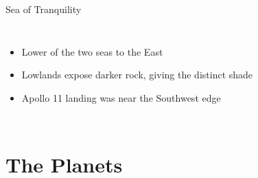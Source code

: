 \documentclass[pdf, aspectratio=169]{beamer}
\begin{document}
\begin{frame}{Sea of Tranquility}
	\begin{columns}
		\begin{itemize}
			\item Lower of the two seas to the East
			\item Lowlands expose darker rock, giving the distinct shade
			\item Apollo 11 landing was near the Southwest edge
		\end{itemize}
		\begin{center}
		\end{center}
	\end{columns}
\end{frame}

\section{The Planets}
\end{document}
